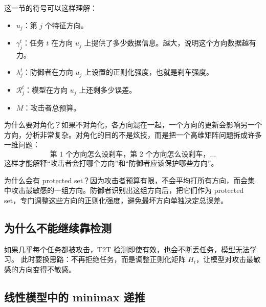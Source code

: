 \documentclass[UTF8,fontset=none,11pt]{ctexart}
\theoremstyle{cnstyle}
\newcommand{\calR}{\mathcal{R}}
\begin{document}
这一节的符号可以这样理解：
\begin{itemize}
  \item \(u_j\)：第 \(j\) 个特征方向。
  \item \(\gamma_j^t\)：任务 \(t\) 在方向 \(u_j\) 上提供了多少数据信息。越大，说明这个方向数据越有力。
  \item \(\lambda_j^t\)：防御者在方向 \(u_j\) 上设置的正则化强度，也就是刹车强度。
  \item \(\calR_j^t\)：模型在方向 \(u_j\) 上还剩多少误差。
  \item \(M\)：攻击者总预算。
\end{itemize}

为什么要对角化？如果不对角化，各方向混在一起，一个方向的更新会影响另一个方向，分析非常复杂。对角化的目的不是炫技，而是把一个高维矩阵问题拆成许多一维问题：
\[
  \text{第 }1\text{ 个方向怎么设刹车，}
  \text{第 }2\text{ 个方向怎么设刹车，}\dots
\]
这样才能解释“攻击者会打哪个方向”和“防御者应该保护哪些方向”。

为什么会有 protected set？因为攻击者预算有限，不会平均打所有方向，而会集中攻击最敏感的一组方向。防御者识别出这组方向后，把它们作为 protected set，专门调整这些方向的正则化强度，避免最坏方向单独决定总误差。

\subsection{为什么不能继续靠检测}

如果几乎每个任务都被攻击，T2T 检测即使有效，也会不断丢任务，模型无法学习。
此时要换思路：不再拒绝任务，而是调整正则化矩阵 \(H_t\)，让模型对攻击最敏感的方向变得不敏感。

\subsection{线性模型中的 minimax 递推}
\end{document}
